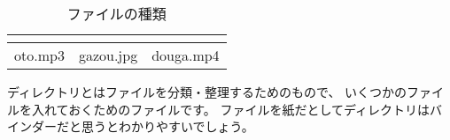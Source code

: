 \begin{table}[H]
  \begin{center}
    \caption[tab:files]{ファイルの種類}
    \begin{tabular}{|c|c|c|} \hline
    \begin{minipage}{0.3\hsize}
      \begin{center}
        
      \end{center}  
    \end{minipage} & 
    \begin{minipage}{0.3\hsize}
      \begin{center}
        
      \end{center}
    \end{minipage} &
    \begin{minipage}{0.3\hsize}
      \begin{center}
        
      \end{center} 
    \end{minipage} \\ \hline
    oto.mp3 & gazou.jpg & douga.mp4 \\ \hline
  \end{tabular}
 \end{center}
\end{table}


ディレクトリとはファイルを分類・整理するためのもので、
いくつかのファイルを入れておくためのファイルです。
ファイルを紙だとしてディレクトリはバインダーだと思うとわかりやすいでしょう。

